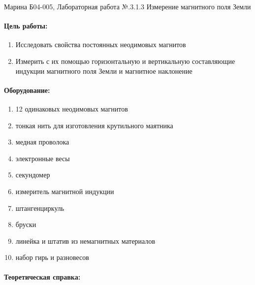 \documentclass[a4paper,12pt]{article}
\author{Бичина Марина 
группа Б04-005 1 курса ФЭФМ}
\title{}
\date{}
\begin{document}

\begin{center}
\begin{Large}
{ Марина Б04-005, Лабораторная работа №.3.1.3 Измерение магнитного поля Земли}
\end{Large}
\end{center}
\paragraph{Цель работы:} 
\begin{enumerate}
\itemsep0em
\item Исследовать свойства постоянных неодимовых магнитов
\item Измерить с их помощью горизонтальную и вертикальную составляющие индукции магнитного поля Земли и магнитное наклонение 
\end{enumerate}
\paragraph{Оборудование:}
\begin{enumerate}
\itemsep0em
\item 12 одинаковых неодимовых магнитов
\item тонкая нить для изготовления крутильного маятника
\item медная проволока
\item электронные весы
\item секундомер
\item измеритель магнитной индукции
\item штангенциркуль
\item бруски
\item линейка и штатив из немагнитных материалов
\item набор гирь и разновесов
\end{enumerate}


\paragraph{Теоретическая справка:}
\end{document}
